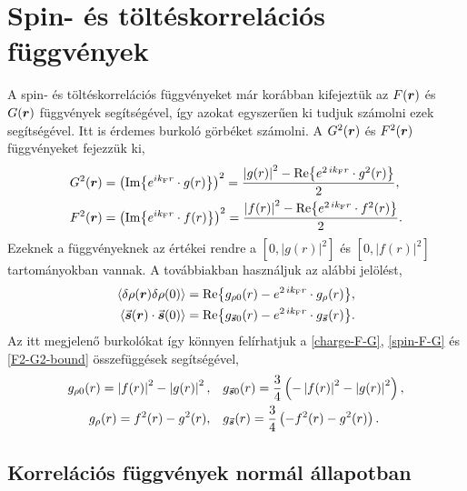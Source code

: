 \documentclass[a4paper,12pt,titlepage]{article}
\newcommand{\RR}{{\vb*{r}}}
\newcommand{\kF}{{k_\text{F}}}
\begin{document}
\section{Spin- és töltéskorrelációs függvények}

A spin- és töltéskorrelációs függvényeket már korábban kifejeztük az $F(\RR)$ és $G(\RR)$ függvények segítségével, így azokat egyszerűen ki tudjuk számolni ezek segítségével.  Itt is érdemes burkoló görbéket számolni.  A $G^2(\RR)$ és $F^2(\RR)$ függvényeket fejezzük ki,
\begin{equation} \label{F2-G2-bound}
\begin{split}
	G^2(\RR) & = \left(\Im{ e^{i \kF r} \cdot g(r) }\right)^2 = \frac{\left| g(r) \right|^2 - \Re{ e^{2 \, i \kF r} \cdot g^2(r) }}{2}, \\
	F^2(\RR) & = \left(\Im{ e^{i \kF r} \cdot f(r) }\right)^2 = \frac{\left| f(r) \right|^2 - \Re{ e^{2 \, i \kF r} \cdot f^2(r) }}{2}.
\end{split}
\end{equation}
Ezeknek a függvényeknek az értékei rendre a $\left[ 0, \left| g(r) \right|^2 \right]$ és $\left[ 0, \left| f(r) \right|^2 \right]$ tartományokban vannak.  A továbbiakban használjuk az alábbi jelölést,
\begin{equation}
\begin{split}
	\expval{\delta\rho(\RR) \delta\rho(0)} & = \Re{g_{\rho 0}(r) - e^{2 \, i \kF r} \cdot g_\rho(r)}, \\
	\expval{\va*{s}(\RR) \cdot \va*{s}(0)} & = \Re{g_{\va*{s} 0}(r) - e^{2 \, i \kF r} \cdot g_{\va*{s}}(r)}.
\end{split}
\end{equation}
Az itt megjelenő burkolókat így könnyen felírhatjuk a \eqref{charge-F-G}, \eqref{spin-F-G} és \eqref{F2-G2-bound} összefüggések segítségével,
\begin{equation} \label{charge-spin-bound}
\begin{split}
	g_{\rho 0}(r) = \left| f(r) \right|^2 - \left| g(r) \right|^2, ~~~ & g_{\va*{s} 0}(r) = \frac{3}{4} \left( -\left| f(r) \right|^2 - \left| g(r) \right|^2 \right), \\
	g_\rho(r) = f^2(r) - g^2(r), ~~~ & g_{\va*{s}}(r) = \frac{3}{4} \left( -f^2(r) - g^2(r) \right).
\end{split}
\end{equation}


\subsection{Korrelációs függvények normál állapotban}
\end{document}
